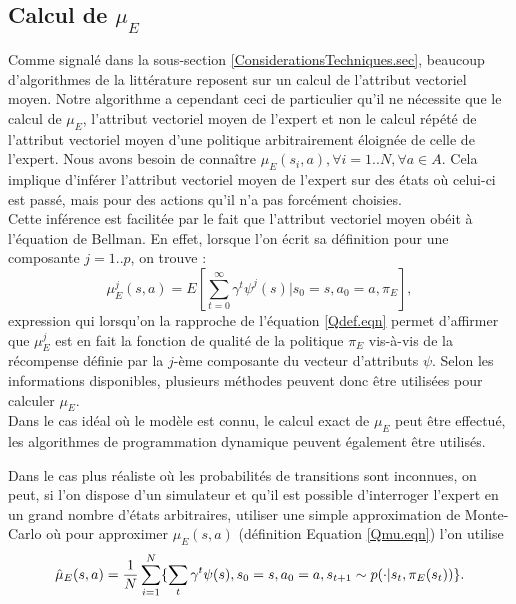 \documentclass[publibook-draft]{CAp2012}
\begin{document}
\subsection{Calcul de $\mu_E$}
\label{calculmu.sec}
Comme signalé dans la sous-section \ref{ConsiderationsTechniques.sec}, beaucoup d'algorithmes de la littérature reposent sur un calcul de l'attribut vectoriel moyen. Notre algorithme a cependant ceci de particulier qu'il ne nécessite que le calcul de $\mu_E$, l'attribut vectoriel moyen de l'expert et non le calcul répété de l'attribut vectoriel moyen d'une politique arbitrairement éloignée de celle de l'expert. Nous avons besoin de connaître $\mu_E(s_i,a), \forall i= 1..N,\forall a \in A$. Cela implique d'inférer l'attribut vectoriel moyen de l'expert sur des états où celui-ci est passé, mais pour des actions qu'il n'a pas forcément choisies.\\ %

Cette inférence est facilitée par le fait que l'attribut vectoriel moyen obéit à l'équation de Bellman. En effet, lorsque l'on écrit sa définition pour une composante $j=1..p$, on trouve :
\begin{equation}
\mu_E^j(s,a) = E[\sum\limits_{t=0}^\infty \gamma^t \psi^j(s)|s_0 = s, a_0 = a, \pi_E],
\end{equation}
expression qui lorsqu'on la rapproche de l'équation \eqref{Qdef.eqn} permet d'affirmer que $\mu^j_E$ est en fait la fonction de qualité de la politique $\pi_E$ vis-à-vis de la récompense définie par la $j$-ème composante du vecteur d'attributs $\psi$. Selon les informations disponibles, plusieurs méthodes peuvent donc être utilisées pour calculer $\mu_E$.\\

Dans le cas idéal où le modèle est connu, le calcul exact de $\mu_E$ peut être effectué, les algorithmes de programmation dynamique peuvent également être utilisés.

Dans le cas plus réaliste où les probabilités de transitions sont inconnues, on peut, si l'on dispose d'un simulateur et qu'il est possible d'interroger l'expert en un grand nombre d'états arbitraires, utiliser une simple approximation de Monte-Carlo où pour approximer $\mu_E(s,a)$ (définition Equation \eqref{Qmu.eqn}) l'on utilise 
\begin{equation}
\hat\mu_E(s,a) = {1\over N}\sum\limits_{i=1}^{N}\{\sum\limits_{t}\gamma^t\psi(s), s_0=s, a_0=a, s_{t+1} \sim p(\cdot|s_t,\pi_E(s_t))\}.
\end{equation}
\end{document}
